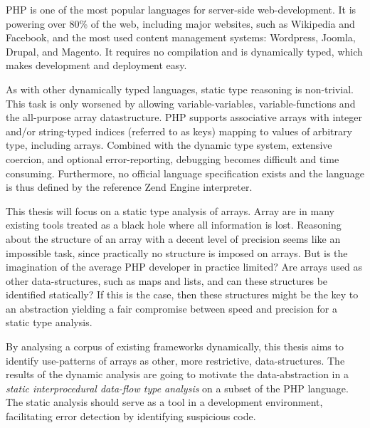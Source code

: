 PHP is one of the most popular languages for server-side web-development. It is powering over 80\% of the web, including major websites, such as Wikipedia and Facebook, and the most used content management systems: Wordpress, Joomla, Drupal, and Magento. It requires no compilation and is dynamically typed, which makes development and deployment easy. 

As with other dynamically typed languages, static type reasoning is non-trivial. This task is only worsened by allowing variable-variables, variable-functions and the all-purpose array datastructure. PHP supports associative arrays with integer and/or string-typed indices (referred to as keys) mapping to values of arbitrary type, including arrays. Combined with the dynamic type system, extensive coercion, and optional error-reporting, debugging becomes difficult and time consuming. Furthermore, no official language specification exists and the language is thus defined by the reference Zend Engine interpreter.


This thesis will focus on a static type analysis of arrays. Array are in many existing tools treated as a black hole where all information is lost.  Reasoning about the structure of an array with a decent level of precision seems like an impossible task, since practically no structure is imposed on arrays. But is the imagination of the average PHP developer in practice limited? Are arrays used as other data-structures, such as maps and lists, and can these structures be identified statically? If this is the case, then these structures might be the key to an abstraction yielding a fair compromise between speed and precision for a static type analysis. 

By analysing a corpus of existing frameworks dynamically, this thesis aims to identify use-patterns of arrays as other, more restrictive, data-structures. The results of the dynamic analysis are going to motivate the data-abstraction in a \emph{static interprocedural data-flow type analysis} on a subset of the PHP language. The static analysis should serve as a tool in a development environment, facilitating error detection by identifying suspicious code. 


